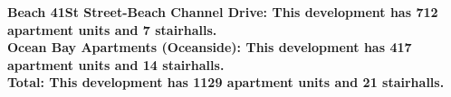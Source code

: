 \bf{Beach 41St Street-Beach Channel Drive}: This development has 712 apartment units and 7 stairhalls.\\\bf{Ocean Bay Apartments (Oceanside)}: This development has 417 apartment units and 14 stairhalls.\\\bf{Total}: This development has 1129 apartment units and 21 stairhalls.\\